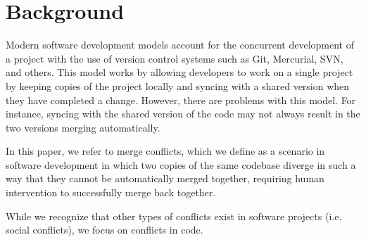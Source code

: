 \section{Background}\label{background}


Modern software development models account for the concurrent development of a project with the use of version control systems such as Git, Mercurial, SVN, and others. This model works by allowing developers to work on a single project by keeping copies of the project locally and syncing with a shared version when they have completed a change. However, there are problems with this model. For instance, syncing with the shared version of the code may not always result in the two versions merging automatically.

In this paper, we refer to merge conflicts, which we define as a scenario in software development in which two copies of the same codebase diverge in such a way that they cannot be automatically merged together, requiring human intervention to successfully merge back together. 

While we recognize that other types of conflicts exist in software projects (i.e. social conflicts), we focus on conflicts in code.